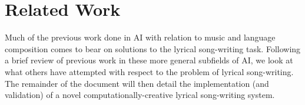 \documentclass[11pt,phd]{byuprop}
\begin{document}

\section{Related Work}

Much of the previous work done in AI with relation to music and language composition comes to bear on solutions to the lyrical song-writing task. Following a brief review of previous work in these more general subfields of AI, we look at what others have attempted with respect to the problem of lyrical song-writing. The remainder of the document will then detail the implementation (and validation) of a novel computationally-creative lyrical song-writing system.

\end{document}
